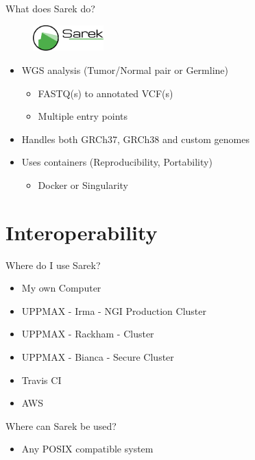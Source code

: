 \documentclass{beamer}
\begin{document}
\begin{frame}{What does Sarek do?}
	\begin{figure}
		\includegraphics[height=1cm]{pictures/Sarek_no_border}
	\end{figure}
	\begin{itemize}
		\item WGS analysis (Tumor/Normal pair or Germline)
		\begin{itemize}
			\item FASTQ(s) to annotated VCF(s)
			\item Multiple entry points
		\end{itemize}
		\pause
		\item Handles both GRCh37, GRCh38 and custom genomes
		\pause
		\item Uses containers (Reproducibility, Portability)
		\begin{itemize}
			\item Docker or Singularity
		\end{itemize}
	\end{itemize}
\end{frame}

\section{Interoperability}

\begin{frame}{Where do I use Sarek?}
	\begin{itemize}
		\item My own Computer
		\pause
		\item UPPMAX - Irma - NGI Production Cluster
		\item UPPMAX - Rackham - Cluster
		\item UPPMAX - Bianca - Secure Cluster
		\pause
		\item Travis CI
		\pause
		\item AWS
	\end{itemize}
\end{frame}

\begin{frame}{Where can Sarek be used?}
	\begin{itemize}
		\item Any POSIX compatible system
	\end{itemize}
\end{frame}
\end{document}
